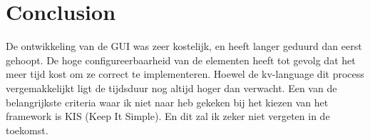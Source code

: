 \chapter{Conclusion}
\label{cha:conclusion}
De ontwikkeling van de GUI was zeer kostelijk, en heeft langer geduurd dan eerst gehoopt. De hoge configureerbaarheid van de elementen heeft tot gevolg dat het meer tijd kost om ze correct te implementeren. Hoewel de kv-language dit process vergemakkelijkt ligt de tijdsduur nog altijd hoger dan verwacht. Een van de belangrijkste criteria waar ik niet naar heb gekeken bij het kiezen van het framework is KIS (Keep It Simple). En dit zal ik zeker niet vergeten in de toekomst. 
